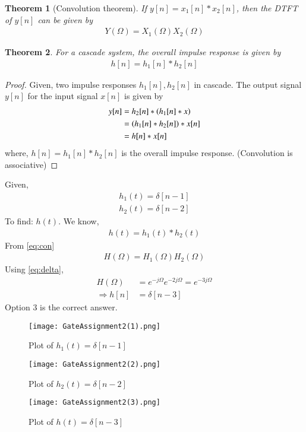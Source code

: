 \documentclass[journal,12pt,twocolumn]{IEEEtran}
\newtheorem{theorem}{Theorem}[section]
\begin{document}
\begin{theorem}[Convolution theorem]If $y[n]=x_1[n]*x_2[n]$, then the DTFT of $y[n]$ can be given by
\begin{align}
    Y(\Omega)=X_1(\Omega)X_2(\Omega)\label{eq:con}
\end{align}
\end{theorem}
\begin{theorem}For a cascade system, the overall impulse response is given by
\begin{align}
    h[n]=h_1[n]*h_2[n]\label{eq:oimp}
\end{align}
\end{theorem}
\begin{proof}
Given, two impulse responses $h_1[n],h_2[n]$ in cascade. The output signal $y[n]$ for the input signal $x[n]$ is given by
\begin{align}
    y[n]&=h_2[n]*\left(h_1[n]*x\right)\\
    &=\left(h_1[n]*h_2[n]\right)*x[n]\\
    &=h[n]*x[n]
\end{align}
where, $h[n]=h_1[n]*h_2[n]$ is the overall impulse response. (Convolution is associative)
\end{proof}
Given,
\begin{align}
    h_1(t)=\delta[n-1]\\
    h_2(t)=\delta[n-2]
\end{align}
To find: $h(t)$. We know, 
\begin{align}
h(t)=h_1(t)*h_2(t)
\end{align}
From \eqref{eq:con}
\begin{align}
H(\Omega)=H_1(\Omega)H_2(\Omega)
\end{align}
Using \eqref{eq:delta}, 
\begin{align}
H(\Omega)&=e^{-j\Omega}e^{-2j\Omega}=e^{-3j\Omega}\\
\Rightarrow h[n]&=\delta[n-3]
\end{align}
Option 3 is the correct answer.
\begin{figure}[!h]
 \centering
 \texttt{[image: GateAssignment2(1).png]}
 \caption{Plot of $h_1(t)=\delta[n-1]$}
 \label{plot}
\end{figure}
\begin{figure}[!h]
 \centering
 \texttt{[image: GateAssignment2(2).png]}
 \caption{Plot of $h_2(t)=\delta[n-2]$}
 \label{plot}
\end{figure}
\begin{figure}[!h]
 \centering
 \texttt{[image: GateAssignment2(3).png]}
 \caption{Plot of $h(t)=\delta[n-3]$}
 \label{plot}
\end{figure}
\end{document}
